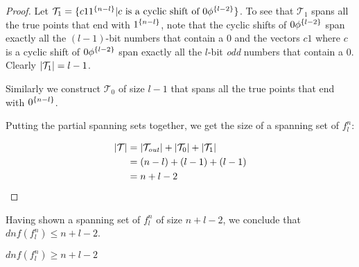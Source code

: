 \begin{proof}
Let $\mathcal{T}_1 = \{c 1 1^{\{n-l\}}
| c \text{ is a cyclic shift of } 0 \phi^{\{l-2\}}\}$.
To see that $\mathcal{T}_1$ spans all the true points
that end with $1^{\{n-l\}}$,
note that the cyclic shifts of $0 \phi^{\{l-2\}}$
span exactly all the $(l-1)$-bit numbers that contain a $0$
and the vectors $c 1$
where $c$ is a cyclic shift of $0 \phi^{\{l-2\}}$
span exactly all the $l$-bit \emph{odd} numbers
that contain a $0$.
Clearly $\lvert\mathcal{T}_1\rvert = l-1$.

Similarly we construct $\mathcal{T}_0$ of size $l-1$
that spans all the true points
that end with $0^{\{n-l\}}$.

Putting the partial spanning sets together,
we get the size of a spanning set of $f_l^n$:

\begin{align*}
\lvert\mathcal{T}\rvert
&= \lvert\mathcal{T}_{\mathit{out}}\rvert
+ \lvert\mathcal{T}_0\rvert + \lvert\mathcal{T}_1\rvert \\
&= (n-l) + (l-1) + (l-1) \\
&= n + l - 2
\end{align*}
\end{proof}

Having shown a spanning set of $f_l^n$ of size $n+l-2$,
we conclude that $dnf(f_l^n) \leq n+l-2$.

\begin{lemma}
$dnf(f_l^n) \geq n+l-2$
\end{lemma}

